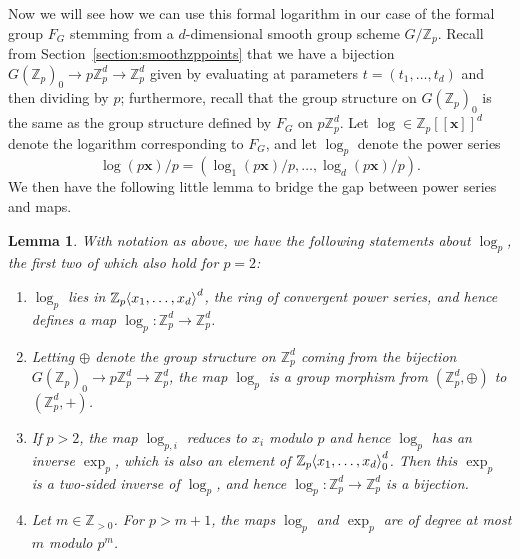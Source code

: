 \documentclass[12pt]{article}
\newcommand{\Z}{\mathbb{Z}}
\newcommand{\vx}{\mathbf{x}}
\renewcommand{\angle}[1]{\hspace{-2pt}\left\langle #1 \right\rangle}
\theoremstyle{plain}
\newtheorem{lem}[thm]{Lemma} %
\theoremstyle{definition}
\theoremstyle{remark}
\begin{document}
Now we will see how we can use this formal logarithm in our case of the formal group $F_G$ stemming from a $d$-dimensional smooth group scheme $G/\Z_p$. Recall from Section~\ref{section:smoothzppoints} that we have a bijection $G(\Z_p)_0 \to p\Z_p^d \to \Z_p^d$ given by evaluating at parameters $t = (t_1,\dots,t_d)$ and then dividing by $p$; furthermore, recall that the group structure on $G(\Z_p)_0$ is the same as the group structure defined by $F_G$ on $p\Z_p^d$. Let $\log \in \Z_p[[\vx]]^d$ denote the logarithm corresponding to $F_G$, and let $\log_p$ denote the power series \[\log(p\vx)/p = (\log_1(p\vx)/p,\dots,\log_d(p\vx)/p).\]
We then have the following little lemma to bridge the gap between power series and maps.
\begin{lem}
\label{lem:formallog}
With notation as above, we have the following statements about $\log_p$, the first two of which also hold for $p=2$:
\begin{enumerate}
	\item $\log_p$ lies in $\Z_p\angle{x_1,\dots,x_d}^d$, the ring of convergent power series, and hence defines a map $\log_p: \Z_p^d \to \Z_p^d$.
	\item Letting $\oplus$ denote the group structure on $\Z_p^d$ coming from the bijection $G(\Z_p)_0 \to p\Z_p^d \to \Z_p^d$, the map $\log_p$ is a group morphism from $(\Z_p^d,\oplus)$ to $(\Z_p^d,+)$.
	\item If $p > 2$, the map $\log_{p,i}$ reduces to $x_i$ modulo $p$ and hence $\log_p$ has an inverse $\exp_p$, which is also an element of $\Z_p\angle{x_1,\dots,x_d}_0^d$. Then this $\exp_p$ is a two-sided inverse of $\log_p$, and hence $\log_p: \Z_p^d \to \Z_p^d$ is a bijection.
	\item Let $m \in \Z_{>0}$. For $p > m+1$, the maps $\log_p$ and $\exp_p$ are of degree at most $m$ modulo $p^m$.
\end{enumerate} 
\end{lem}
\end{document}

